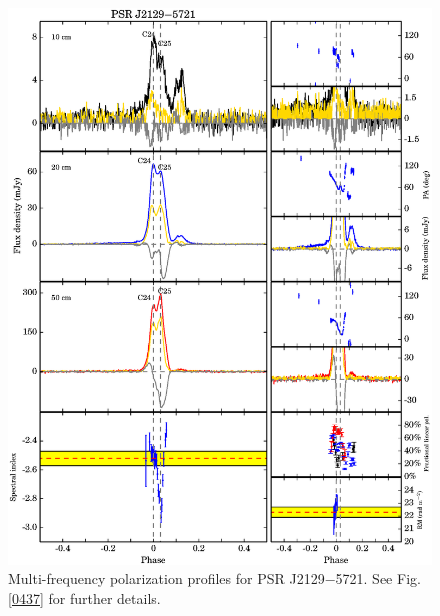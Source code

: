 \documentclass[useAMS,usenatbib]{mn2e}
\begin{document}
\begin{appendices}
\begin{figure}
\begin{center}
\includegraphics[width=6 in]{2129.ps}
\caption{Multi-frequency polarization profiles for PSR J2129$-$5721. 
See Fig. \ref{0437} for further details.}
\label{2129}
\end{center}
\end{figure}


\end{appendices}
\end{document}
